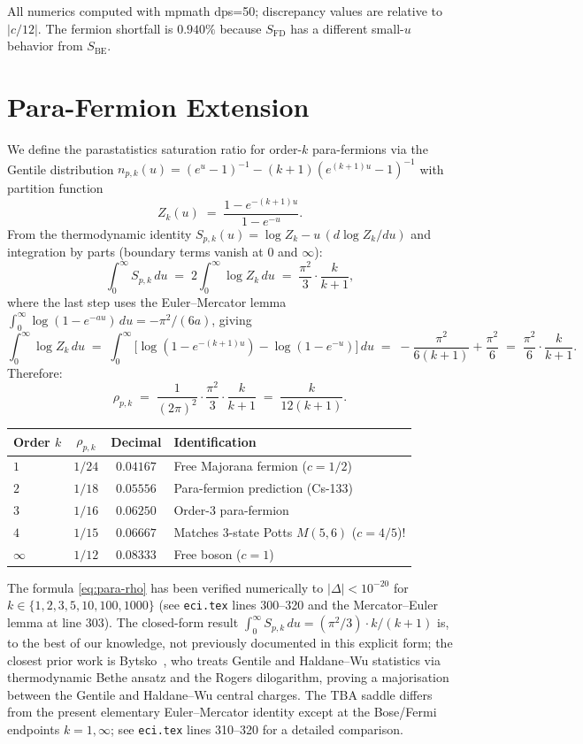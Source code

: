 \documentclass[12pt]{article}
\begin{document}
All numerics computed with mpmath dps=50; discrepancy values are
relative to $|c/12|$.  The fermion shortfall is $0.940\%$ because
$S_{\mathrm{FD}}$ has a different small-$u$ behavior from $S_{\mathrm{BE}}$.

\section{Para-Fermion Extension}

We define the parastatistics saturation ratio for order-$k$
para-fermions via the Gentile distribution
$n_{p,k}(u) = (e^u-1)^{-1} - (k+1)(e^{(k+1)u}-1)^{-1}$
with partition function
\[
  Z_k(u) \;=\; \frac{1-e^{-(k+1)u}}{1-e^{-u}}.
\]
From the thermodynamic identity
$S_{p,k}(u) = \log Z_k - u\,(d\log Z_k/du)$ and integration by parts
(boundary terms vanish at $0$ and $\infty$):
\[
  \int_0^\infty S_{p,k}\,du
  \;=\; 2\int_0^\infty \log Z_k\,du
  \;=\; \frac{\pi^2}{3}\cdot\frac{k}{k+1},
\]
where the last step uses the Euler--Mercator lemma
$\int_0^\infty\log(1-e^{-au})\,du = -\pi^2/(6a)$, giving
\[
  \int_0^\infty\log Z_k\,du
  \;=\; \int_0^\infty\bigl[\log(1-e^{-(k+1)u}) - \log(1-e^{-u})\bigr]\,du
  \;=\; -\frac{\pi^2}{6(k+1)} + \frac{\pi^2}{6}
  \;=\; \frac{\pi^2}{6}\cdot\frac{k}{k+1}.
\]
Therefore:
\begin{equation}
  \rho_{p,k} \;=\; \frac{1}{(2\pi)^2}\cdot\frac{\pi^2}{3}\cdot\frac{k}{k+1}
  \;=\; \frac{k}{12(k+1)}.
\label{eq:para-rho}
\end{equation}

\begin{center}
\begin{tabular}{lccl}
\toprule
Order $k$ & $\rho_{p,k}$ & Decimal & Identification\\
\midrule
$1$ & $1/24$ & $0.04167$ & Free Majorana fermion ($c=1/2$)\\
$2$ & $1/18$ & $0.05556$ & Para-fermion prediction (Cs-133)\\
$3$ & $1/16$ & $0.06250$ & Order-3 para-fermion\\
$4$ & $1/15$ & $0.06667$ & Matches 3-state Potts $M(5,6)$ ($c=4/5$)!\\
$\infty$ & $1/12$ & $0.08333$ & Free boson ($c=1$)\\
\bottomrule
\end{tabular}
\end{center}

The formula \eqref{eq:para-rho} has been verified numerically
to $|\Delta| < 10^{-20}$ for $k\in\{1,2,3,5,10,100,1000\}$
(see \texttt{eci.tex} lines 300--320 and the Mercator--Euler
lemma at line 303).  The closed-form result
$\int_0^\infty S_{p,k}\,du = (\pi^2/3)\cdot k/(k+1)$ is, to
the best of our knowledge, not previously documented in this
explicit form; the closest prior work is
Bytsko~\cite{Bytsko2002}, who treats Gentile and Haldane--Wu
statistics via thermodynamic Bethe ansatz and the Rogers dilogarithm,
proving a majorisation between the Gentile and Haldane--Wu central
charges.  The TBA saddle differs from the present elementary
Euler--Mercator identity except at the Bose/Fermi endpoints
$k=1,\infty$; see \texttt{eci.tex} lines 310--320 for a detailed
comparison.
\end{document}
